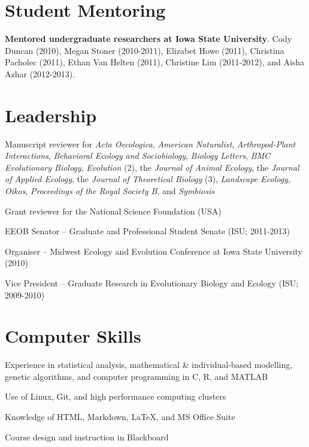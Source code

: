 \documentclass[letterpaper]{article}
\renewenvironment{itemize}{
  \begin{list}{}{
    \setlength{\leftmargin}{1.5em}
  }
}{
  \end{list}
}
\begin{document}
\section*{Student Mentoring}
\begin{itemize}
\item {\bf Mentored undergraduate researchers at Iowa State University}. Cody Duncan (2010), Megan Stoner (2010-2011), Elizabet Howe (2011), Christina Pacholec (2011), Ethan Van Helten (2011), Christine Lim (2011-2012), and Aisha Azhar (2012-2013).
\end{itemize}

\section*{Leadership}
\begin{itemize}
\item Manuscript reviewer for {\it Acta Oecologica}, {\it American Naturalist}, {\it Arthropod-Plant Interactions}, {\it Behavioral Ecology and Sociobiology}, {\it Biology Letters}, {\it BMC Evolutionary Biology}, {\it Evolution} (2), the {\it Journal of Animal Ecology}, the {\it Journal of Applied Ecology}, the {\it Journal of Theoretical Biology} (3), {\it Landscape Ecology}, {\it Oikos}, {\it Proceedings of the Royal Society B}, and {\it Symbiosis}
\item Grant reviewer for the National Science Foundation (USA) 
\item EEOB Senator -- Graduate and Professional Student Senate (ISU; 2011-2013)
\item Organiser -- Midwest Ecology and Evolution Conference at Iowa State University (2010)
\item Vice President -- Graduate Research in Evolutionary Biology and Ecology (ISU; 2009-2010)
\end{itemize}

\section*{Computer Skills}
\begin{itemize}
\item Experience in statistical analysis, mathematical \& individual-based modelling, genetic algorithms, and computer programming in C, R, and MATLAB
\item Use of Linux, Git, and high performance computing clusters
\item Knowledge of HTML, Markdown, \LaTeX, and MS Office Suite
\item Course design and instruction in Blackboard
\end{itemize}
\end{document}
